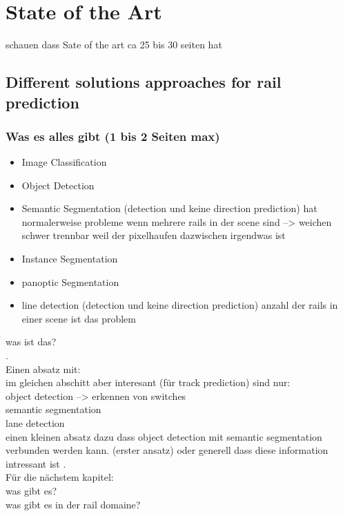 \chapter{State of the Art}
\label{sec:stateOfTheArt}

schauen dass Sate of the art ca 25 bis 30 seiten hat

\section{Different solutions approaches for rail prediction}

\subsection{Was es alles gibt (1 bis 2 Seiten max)}

\begin{itemize}
    \item Image Classification
    \item Object Detection
    \item Semantic Segmentation (detection und keine direction prediction) hat normalerweise probleme wenn mehrere rails in der scene sind --> weichen schwer trennbar weil der pixelhaufen dazwischen irgendwas ist
    \item Instance Segmentation
    \item panoptic Segmentation
    \item line detection (detection und keine direction prediction) anzahl der rails in einer scene ist das problem
\end{itemize}

was ist das? \\
.\\
Einen absatz mit: \\
im gleichen abschitt aber interesant (für track prediction) sind nur: \\
object detection --> erkennen von switches \\
semantic segmentation \\
lane detection \\
einen kleinen absatz dazu dass object detection mit semantic segmentation verbunden werden kann. (erster ansatz) oder generell dass diese information intressant ist
.\\
Für die nächstem kapitel:\\
was gibt es?\\
was gibt es in der rail domaine?\\

